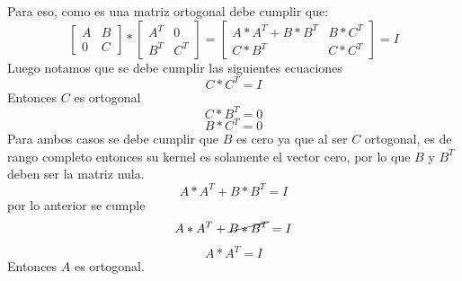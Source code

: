 \documentclass{article}
\begin{document}
Para eso, como es una matriz ortogonal debe cumplir que:
$$
\begin{bmatrix}
A & B\\
0 & C
\end{bmatrix}
*
\begin{bmatrix}
A^{T}& 0\\
B^{T} & C^{T}
\end{bmatrix}
=
\begin{bmatrix}
A*A^{T} + B*B^{T}& B*C^{T}\\
C*B^{T}& C*C^{T}
\end{bmatrix}
=
I$$
Luego notamos que se debe cumplir las siguientes ecuaciones
\begin{equation}
C*C^{T}=I
\end{equation}
Entonces $C$ es ortogonal
\begin{equation}
C*B^{T}=0
\end{equation}
\begin{equation}
B*C^{T}=0
\end{equation}
Para ambos casos se debe cumplir que $B$ es cero ya que al ser $C$ ortogonal, es de rango completo entonces su kernel es solamente el vector cero, por lo que $B$ y $B^{T}$ deben ser la matriz nula.
\begin{equation}
A*A^{T}+B*B^{T}=I
\end{equation}
por lo anterior se cumple 
$$A*A^{T} + \cancel{B*B^{T}}=I$$
$$A*A^{T} = I$$
Entonces $A$ es ortogonal.
\end{document}
